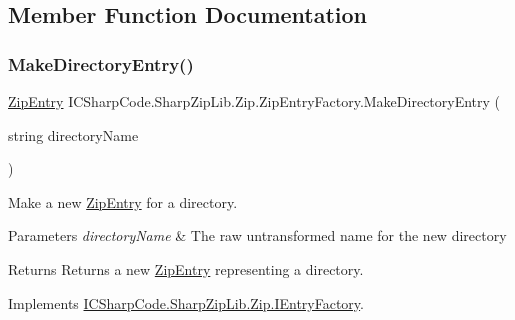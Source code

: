 \subsection{Member Function Documentation}
\mbox{\label{class_i_c_sharp_code_1_1_sharp_zip_lib_1_1_zip_1_1_zip_entry_factory_ad55262fe2c27de18177df0122284098d}} 
\subsubsection{\texorpdfstring{Make\+Directory\+Entry()}{MakeDirectoryEntry()}\hspace{0.1cm}{\footnotesize\ttfamily [1/2]}}
{\footnotesize\ttfamily \hyperlink{class_i_c_sharp_code_1_1_sharp_zip_lib_1_1_zip_1_1_zip_entry}{Zip\+Entry} I\+C\+Sharp\+Code.\+Sharp\+Zip\+Lib.\+Zip.\+Zip\+Entry\+Factory.\+Make\+Directory\+Entry (\begin{DoxyParamCaption}\item[{string}]{directory\+Name }\end{DoxyParamCaption})\hspace{0.3cm}{\ttfamily [inline]}}



Make a new \hyperlink{class_i_c_sharp_code_1_1_sharp_zip_lib_1_1_zip_1_1_zip_entry}{Zip\+Entry} for a directory. 


\begin{DoxyParams}{Parameters}
{\em directory\+Name} & The raw untransformed name for the new directory\\
\hline
\end{DoxyParams}
\begin{DoxyReturn}{Returns}
Returns a new \hyperlink{class_i_c_sharp_code_1_1_sharp_zip_lib_1_1_zip_1_1_zip_entry}{Zip\+Entry} representing a directory.
\end{DoxyReturn}


Implements \hyperlink{interface_i_c_sharp_code_1_1_sharp_zip_lib_1_1_zip_1_1_i_entry_factory_ac7abeeef0810ca110b63406bc1dfab0e}{I\+C\+Sharp\+Code.\+Sharp\+Zip\+Lib.\+Zip.\+I\+Entry\+Factory}.

